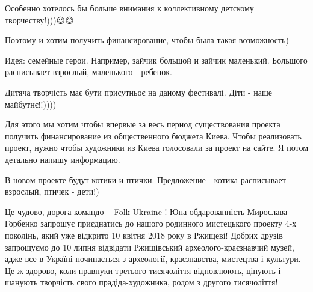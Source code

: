 
 
 
 
 

\qqSecCmt


Особенно хотелось бы больше внимания к коллективному детскому
творчеству!)))😉😊


Поэтому и хотим получить финансирование, чтобы была такая возможность)


Идея: семейные герои. Например, зайчик большой и зайчик маленький. Большого
расписывает взрослый, маленького - ребенок.


Дитяча творчість має бути присутньоє на даному фестивалі. Діти - наше
майбутнє!!))))


Для этого мы хотим чтобы впервые за весь период существования проекта получить
финансирование из общественного бюджета Киева. Чтобы реализовать проект, нужно
чтобы художники из Киева голосовали за проект на сайте. Я потом детально напишу
информацию.


В новом проекте будут котики и птички. Предложение - котика расписывает
взрослый, птичек - дети!)


Це чудово, дорога командо 💛💙 Folk Ukraine ! Юна обдарованність Мирослава
Горбенко запрошує приєднатись до нашого родинного мистецького проекту 4-х
поколінь, який уже відкрито 10 квітня 2018 року в Ржищеві! Добрих друзів
запрошуємо до 10 липня відвідати Ржищівський археолого-краєзнавчий музей, адже
все в Україні починається з археології, краєзнавства, мистецтва і культури. Це
ж здорово, коли правнуки третього тисячоліття відновлюють, цінують і шанують
творчість свого прадіда-художника, родом з другого тисячоліття!

